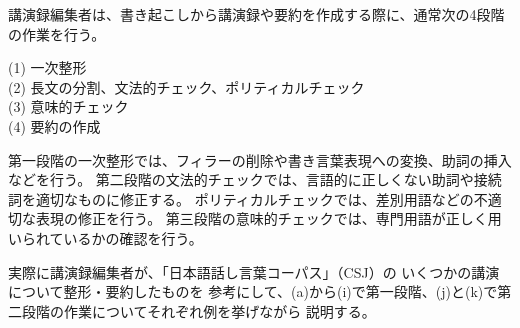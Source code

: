 講演録編集者は、書き起こしから講演録や要約を作成する際に、通常次の4段階の作業を行う。

\begin{description}
\item [(1)  一次整形]
\item [(2)  長文の分割、文法的チェック、ポリティカルチェック]
\item [(3)  意味的チェック]
\item [(4)  要約の作成]
\end{description}

第一段階の一次整形では、フィラーの削除や書き言葉表現への変換、助詞の挿入などを行う。
第二段階の文法的チェックでは、言語的に正しくない助詞や接続詞を適切なものに修正する。
ポリティカルチェックでは、差別用語などの不適切な表現の修正を行う。
第三段階の意味的チェックでは、専門用語が正しく用いられているかの確認を行う。

実際に講演録編集者が、「日本語話し言葉コーパス」（CSJ）\cite{ICSLP2000}の
いくつかの講演について整形・要約したものを
参考にして、(a)から(i)で第一段階、(j)と(k)で第二段階の作業についてそれぞれ例を挙げながら
説明する。

